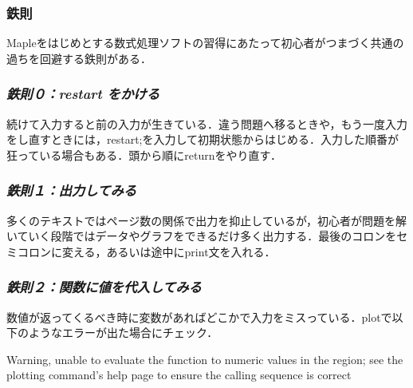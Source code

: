 \documentclass{article}
\begin{document}
\subsubsection{\textbf{鉄則}}
\begin{maplegroup}
\begin{Maple Normal}{
Mapleをはじめとする数式処理ソフトの習得にあたって初心者がつまづく共通の過ちを回避する鉄則がある．}\end{Maple Normal}

\end{maplegroup}
\subsubsection{\textbf{\textit{鉄則０：restart をかける}}}
\begin{maplegroup}
\begin{Maple Normal}{
続けて入力すると前の入力が生きている．違う問題へ移るときや，もう一度入力をし直すときには，restart;を入力して初期状態からはじめる．入力した順番が狂っている場合もある．頭から順にreturnをやり直す．}\end{Maple Normal}

\end{maplegroup}
\subsubsection{\textbf{\textit{鉄則１：出力してみる}}}
\begin{maplegroup}
\begin{Maple Normal}{
多くのテキストではページ数の関係で出力を抑止しているが，初心者が問題を解いていく段階ではデータやグラフをできるだけ多く出力する．最後のコロンをセミコロンに変える，あるいは途中にprint文を入れる．}\end{Maple Normal}

\end{maplegroup}
\subsubsection{\textbf{\textit{鉄則２：関数に値を代入してみる}}}
\begin{maplegroup}
\begin{Maple Normal}{
数値が返ってくるべき時に変数があればどこかで入力をミスっている．plotで以下のようなエラーが出た場合にチェック．}\end{Maple Normal}

\end{maplegroup}
\begin{maplegroup}
\begin{mapleinput}
\end{mapleinput}
\mapleresult
\underline{}Warning, unable to evaluate the function to numeric values in the region; see the plotting command's help page to ensure the calling sequence is correct\underline{}\end{maplegroup}
\end{document}
